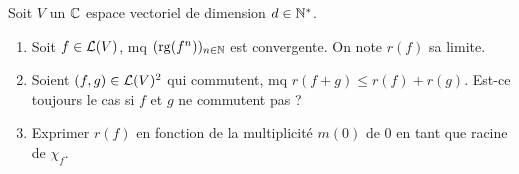 
\providecommand{\Sp}{\operatorname{Sp}}


\begin{statementbox}
Soit $V$ un $\mathbb C$ espace vectoriel de dimension $d \in \mathbb N^*$.
\begin{enumerate}[label=Q\arabic*)]
  \item Soit $f \in \mathcal L(V)$, mq $(\operatorname{rg}(f^n))_{n \in \mathbb N}$ est convergente. On note $r(f)$ sa limite.
  \item Soient $(f,g) \in \mathcal L(V)^2$ qui commutent, mq $r(f+g) \leq r(f) + r(g)$. Est-ce toujours le cas si $f$ et $g$ ne commutent pas ?
  \item Exprimer $r(f)$ en fonction de la multiplicité $m(0)$ de $0$ en tant que racine de $\chi_f$.
\end{enumerate}
\end{statementbox}


